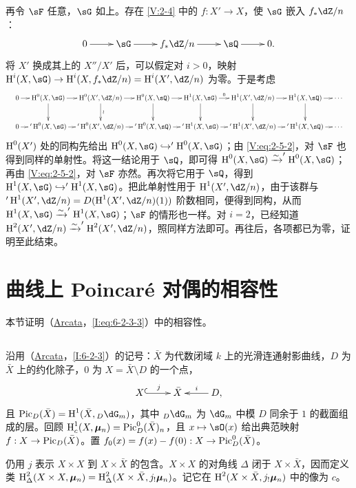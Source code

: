 再令 $\sF$ 任意，$\sG$ 如上。存在 \ref{V:2-4} 中的 $f:X'\to X$，使 $\sG$ 嵌入 $f_*\dZ/n$：
\[\xymatrix{0\ar[r]&\sG\ar[r]&f_*\dZ/n\ar[r]&\sQ\ar[r]&0.}\]
将 $X'$ 换成其上的 $X''/X'$ 后，可以假定对 $i>0$，映射
$\h^i(X,\sG)\to\h^i(X,f_*\dZ/n)=\h^i(X',\dZ/n)$ 为零。于是考虑
\[
\resizebox{\linewidth}{!}{$\xymatrix@C=10pt{
0\ar[r]&\h^0(X,\sG)\ar[r]\ar[d]&\h^0(X',\dZ/n)\ar[r]\ar[d]^-\wr&\h^0(X,\sQ)\ar[r]\ar[d]&\h^1(X,\sG)\ar[r]^-0\ar[d]&\h^1(X',\dZ/n)\ar[r]\ar[d]&\h^1(X,\sQ)\ar[r]\ar[d]&\cdots\\
0\ar[r]&'\h^0(X,\sG)\ar[r]&'\h^0(X',\dZ/n)\ar[r]&'\h^0(X,\sQ)\ar[r]&'\h^1(X,\sG)\ar[r]&'\h^1(X',\dZ/n)\ar[r]&'\h^1(X,\sQ)\ar[r]&\cdots
}$}
\]
$\operatorname{H}^0(X')$ 处的同构先给出 $\h^0(X,\sG)\hookrightarrow'\h^0(X,\sG)$；由 \eqref{V:eq:2-5-2}，对 $\sF$ 也得到同样的单射性。将这一结论用于 $\sQ$，即可得 $\h^0(X,\sG)\iso'\h^0(X,\sG)$；再由 \eqref{V:eq:2-5-2}，对 $\sF$ 亦然。再次将它用于 $\sQ$，得到 $\h^1(X,\sG)\hookrightarrow'\h^1(X,\sG)$。把此单射性用于 $\h^1(X',\dZ/n)$，由于该群与 $'\h^1(X',\dZ/n)=D(\h^1(X',\dZ/n)(1))$ 阶数相同，便得到同构，从而 $\h^1(X,\sG)\iso'\h^1(X,\sG)$；$\sF$ 的情形也一样。对 $i=2$，已经知道 $\h^2(X',\dZ/n)\iso'\h^2(X',\dZ/n)$，照同样方法即可。再往后，各项都已为零，证明至此结束。

\section{曲线上 Poincaré 对偶的相容性}\label{V:3}
本节证明（\hyperref[I]{Arcata}，\ref{I:eq:6-2-3-3}）中的相容性。

\subsection{}\label{V:3-1}
沿用（\hyperref[I]{Arcata}，\ref{I:6-2-3}）的记号：$\bar X$ 为代数闭域 $k$ 上的光滑连通射影曲线，$D$ 为 $\bar X$ 上的约化除子，$0$ 为 $X=\bar X\setminus D$ 的一个点，
\[\xymatrix{X\ar@{^{(}->}[r]^-j&\bar X&\ar[l]_-iD,}\]
且 $\pic_D(\bar X)=\h^1(\bar X,{}_D\dG_m)$，其中 ${}_D\dG_m$ 为 $\dG_m$ 中模 $D$ 同余于 $1$ 的截面组成的层。回顾
$\operatorname{H}_c^1(X,{\bm\mu}_n)=\operatorname{Pic}_D^0(\bar X)_n$，且 $x\mapsto\sO(x)$ 给出典范映射 $f:X\to\operatorname{Pic}_D(\bar X)$。置 $f_0(x)=f(x)-f(0):X\to\operatorname{Pic}_D^0(\bar X)$。

仍用 $j$ 表示 $X\times X$ 到 $X\times\bar X$ 的包含。$X\times X$ 的对角线 $\Delta$ 闭于 $X\times\bar X$，因而定义类
$\operatorname{H}_\Delta^2(X\times X,{\bm\mu}_n)=\operatorname{H}_\Delta^2(X\times\bar X,j_!{\bm\mu}_n)$。记它在 $\operatorname{H}^2(X\times\bar X,j_!{\bm\mu}_n)$ 中的像为 $c$。

